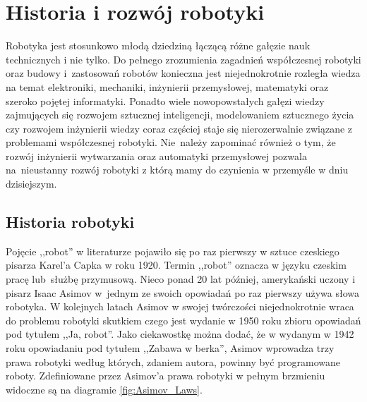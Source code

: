 \chapter{Historia i rozwój robotyki}
\label{ch:history}
Robotyka jest stosunkowo młodą dziedziną łączącą różne gałęzie nauk technicznych
i nie tylko. Do pełnego zrozumienia zagadnień współczesnej robotyki oraz budowy
i~zastosowań robotów konieczna jest niejednokrotnie rozległa wiedza na temat
elektroniki, mechaniki, inżynierii przemysłowej, matematyki oraz szeroko pojętej
informatyki. Ponadto wiele nowopowstałych gałęzi wiedzy zajmujących się rozwojem
sztucznej inteligencji, modelowaniem sztucznego życia czy rozwojem inżynierii
wiedzy coraz częściej staje się nierozerwalnie związane z problemami współczesnej
robotyki. Nie~należy zapominać również o tym, że rozwój inżynierii wytwarzania
oraz automatyki przemysłowej pozwala na~nieustanny rozwój robotyki z którą mamy
do czynienia w przemyśle w dniu dzisiejszym.

\section{Historia robotyki}
Pojęcie ,,robot'' w literaturze pojawiło się po raz pierwszy w sztuce czeskiego
pisarza Karel'a Capka w roku 1920. Termin ,,robot'' oznacza w języku czeskim
pracę lub~służbę przymusową. Nieco ponad 20 lat później, amerykański uczony i
pisarz Isaac Asimov w~jednym ze swoich opowiadań po raz pierwszy używa słowa
robotyka. W kolejnych latach Asimov w swojej twórczości niejednokrotnie wraca do
problemu robotyki skutkiem czego jest wydanie w 1950 roku zbioru opowiadań pod
tytułem ,,Ja, robot''. Jako ciekawostkę można dodać, że w wydanym w 1942 roku
opowiadaniu pod tytułem ,,Zabawa w berka'', Asimov wprowadza trzy prawa robotyki
według których, zdaniem autora, powinny być programowane roboty\cite{Runaround}.
Zdefiniowane przez Asimov'a prawa robotyki w pełnym brzmieniu widoczne są na
diagramie \ref{fig:Asimov_Laws}.

